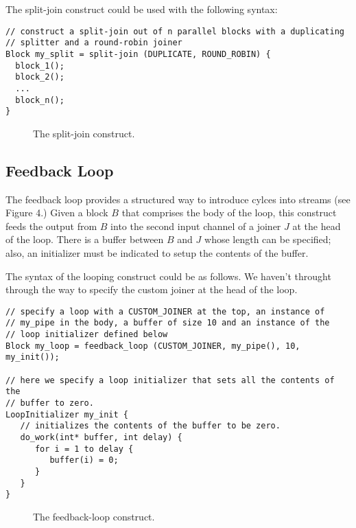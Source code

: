 The split-join construct could be used with the following syntax:

\begin{verbatim}
// construct a split-join out of n parallel blocks with a duplicating
// splitter and a round-robin joiner
Block my_split = split-join (DUPLICATE, ROUND_ROBIN) {
  block_1();
  block_2();
  ...
  block_n();
}
\end{verbatim}

\begin{figure}[t]
\centerline{}
\vspace{-24pt}
\caption{\protect\small The split-join construct.}
\end{figure}

\subsection{Feedback Loop}

The feedback loop provides a structured way to introduce cylces into
streams (see Figure 4.)  Given a block $B$ that comprises the body of
the loop, this construct feeds the output from $B$ into the second input
channel of a joiner $J$ at the head of the loop.  There is a buffer
between $B$ and $J$ whose length can be specified; also, an initializer
must be indicated to setup the contents of the buffer.

The syntax of the looping construct could be as follows.  We haven't
throught through the way to specify the custom joiner at the head of the
loop.

\begin{verbatim}
// specify a loop with a CUSTOM_JOINER at the top, an instance of
// my_pipe in the body, a buffer of size 10 and an instance of the 
// loop initializer defined below
Block my_loop = feedback_loop (CUSTOM_JOINER, my_pipe(), 10, my_init());

// here we specify a loop initializer that sets all the contents of the
// buffer to zero.
LoopInitializer my_init {
   // initializes the contents of the buffer to be zero.
   do_work(int* buffer, int delay) {
      for i = 1 to delay {
         buffer(i) = 0;
      }
   }
}

\end{verbatim}

\begin{figure}[t]
\centerline{}
\caption{\protect\small The feedback-loop construct.}
\end{figure}

